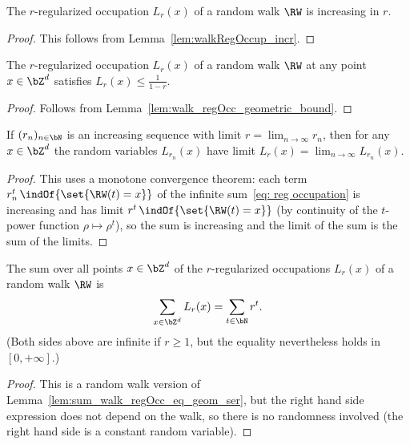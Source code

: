 \begin{lemma}
  \label{lem:regularized_occupation_incr}
  The $r$-regularized occupation $L_r(x)$
  of a random walk $\RW$ is increasing in $r$.
\end{lemma}
\begin{proof}
This follows from Lemma~\ref{lem:walkRegOccup_incr}.
\end{proof}

\begin{lemma}
  \label{lem:regularized_occupation_geometric_bound}
  The $r$-regularized occupation $L_r(x)$
  of a random walk $\RW$ at any point $x \in \bZ^d$
  satisfies $L_r(x) \le \frac{1}{1-r}$.
\end{lemma}
\begin{proof}
Follows from Lemma~\ref{lem:walk_regOcc_geometric_bound}.
\end{proof}

\begin{lemma}
  \label{lem:regularized_occupation_left_cont}
  If $(r_n)_{n \in \bN}$ is an increasing sequence with
  limit $r = \lim_{n \to \infty} r_n$, then
  for any $x \in \bZ^d$ the random variables $L_{r_n}(x)$
  have limit $L_{r}(x) = \lim_{n \to \infty} L_{r_n}(x)$.
\end{lemma}
\begin{proof}
This uses a monotone convergence theorem:
each term $r_n^t \, \indOf{\set{\RW(t) = x}}$ of the infinite
sum~\eqref{eq: reg occupation} is increasing and has
limit $r^t \, \indOf{\set{\RW(t) = x}}$ (by continuity of the
$t$-power function $\rho \mapsto \rho^t$), so the sum is
increasing and the limit of the sum is the sum of the limits.
\end{proof}

\begin{lemma}
  \label{lem:sum_regularized_occupation_eq_geom_ser}
  The sum over all points $x \in \bZ^d$ of the $r$-regularized
  occupations $L_r(x)$ of a random walk $\RW$ is
  \begin{align*}
  \sum_{x \in \bZ^d} L_r(x) = \sum_{t \in \bN} r^t .
  \end{align*}
  (Both sides above are infinite if $r \ge 1$, but the equality
  nevertheless holds in $[0,+\infty]$.)
\end{lemma}
\begin{proof}
This is a random walk version of Lemma~\ref{lem:sum_walk_regOcc_eq_geom_ser},
but the right hand side expression does not depend on the walk, so there
is no randomness involved (the right hand side is a constant random variable).
\end{proof}

